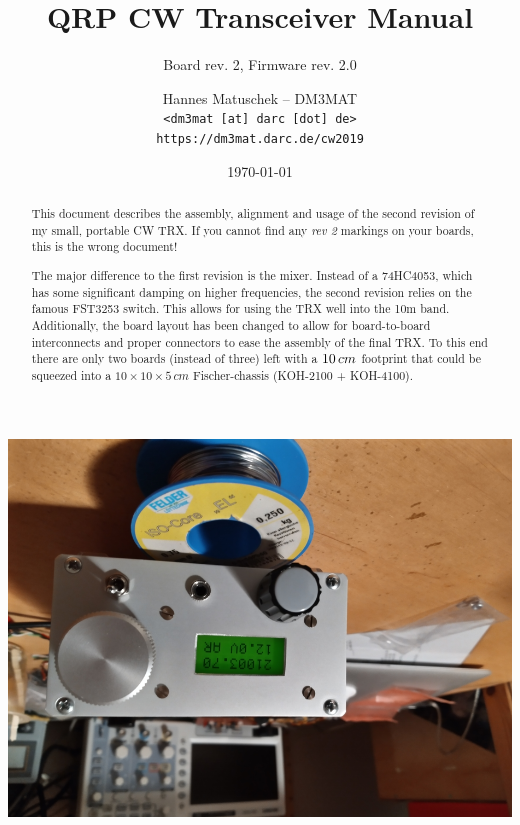 \documentclass[10pt, a4paper,twoside,openright]{scrartcl}
\title{QRP CW Transceiver Manual}
\subtitle{Board rev. 2, Firmware rev. 2.0}
\author{Hannes Matuschek -- DM3MAT\\\texttt{<dm3mat [at] darc [dot] de>}\\\texttt{https://dm3mat.darc.de/cw2019}}
\date{\today}
\begin{document}
\maketitle

\begin{abstract}
This document describes the assembly, alignment and usage of the second revision of my small, portable CW TRX. If you cannot find any \emph{rev 2} markings on your boards, this is the wrong document!

The major difference to the first revision is the mixer. Instead of a 74HC4053, which has some significant damping on higher frequencies, the second revision relies on the famous FST3253 switch. This allows for using the TRX well into the 10m band. Additionally, the board layout has been changed to allow for board-to-board interconnects and proper connectors to ease the assembly of the final TRX. To this end there are only two boards (instead of three) left with a $10\time 8\,cm$ footprint that could be squeezed into a $10 \times 10\times 5\,cm$ Fischer-chassis (KOH-2100 + KOH-4100). 
\end{abstract}
\thispagestyle{empty}
\vfill
\begin{center}
 \includegraphics[width=0.7\linewidth]{fig/complete_small.png}
\end{center}



\cleardoublepage
\tableofcontents
\thispagestyle{empty}

\cleardoublepage
\end{document}
